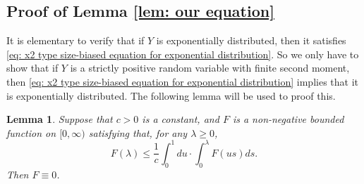 \documentclass[12pt,a4paper]{amsart}
\newtheorem{lem}[thm]{Lemma}
\numberwithin{equation}{section}
\begin{document}
\subsection{Proof of Lemma \ref{lem: our equation}}
\label{sec: proof of our equation}

	It is elementary to verify that if $Y$ is exponentially distributed, then it satisfies \eqref{eq: x2 type size-biased equation for exponential distribution}.
	So we only have to show that if $Y$ is a strictly positive random variable with finite second moment, then \eqref{eq: x2 type size-biased equation for exponential distribution} implies that it is exponentially distributed.
	The following lemma will be used to proof this.

\begin{lem}\label{lem: zero inequality}
	Suppose that $c>0$ is a constant, and $F$  is a non-negative bounded function on $[0,\infty)$ satisfying that, for any $\lambda\geq 0$,
\begin{equation}\label{eq: zero inequality}
	F(\lambda)
	\leq
	\frac{1}{c}\int_0^1du
	\cdot
	\int_0^\lambda F(us)ds.
\end{equation}
	Then $F\equiv 0$.
\end{lem}
\end{document}

